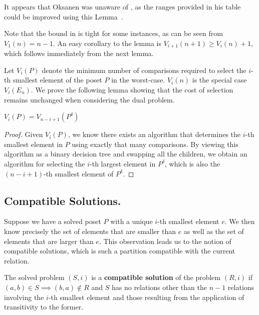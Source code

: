 \documentclass[a4paper,UKenglish,cleveref, autoref, thm-restate]{lipics-v2021}
\newcommand{\dual}[1]{{#1}^{\delta}}
\begin{document}
\begin{remark}
  It appears that Oksanen was unaware of , as the ranges provided in his table could be improved using this Lemma~\cite{Oksanen}.
\end{remark}

Note that the bound in  is tight for some instances, as can be seen from $V_1(n) = n - 1$.
An easy corollary to the lemma is $V_{i + 1}(n + 1) \geq V_i(n) + 1$, which follows immediately from the next lemma.

Let $V_i(P)$ denote the minimum number of comparisons required to select the $i$-th smallest element of the poset $P$ in the worst-case.
$V_i(n)$ is the special case $V_i(E_n)$.
We prove the following lemma showing that the cost of selection remains unchanged when considering the dual problem.

\begin{lemma} \label{lemma:dual_poset_allowed}
  $V_i(P) = V_{n - i + 1}(\dual{P})$
\end{lemma}

\begin{proof}
  Given $V_i(P)$, we know there exists an algorithm that determines the $i$-th smallest element in $P$ using exactly that many comparisons.
  By viewing this algorithm as a binary decision tree and swapping all the children, we obtain an algorithm for selecting the $i$-th largest element in $\dual{P}$, which is also the $(n - i + 1)$-th smallest element of $\dual{P}$.
\end{proof}

\subsection{Compatible Solutions.}
Suppose we have a solved poset $P$ with a unique $i$-th smallest element $e$.
We then know precisely the set of elements that are smaller than $e$ as well as the set of elements that are larger than $e$.
This observation leads us to the notion of compatible solutions, which is such a partition compatible with the current relation.

\begin{definition}
  The solved problem $(S, i)$ is a \textbf{compatible solution} of the problem $(R, i)$ if $(a, b) \in S \implies (b, a) \notin R$ and $S$ has no relations other than the $n - 1$ relations involving the $i$-th smallest element and those resulting from the application of transitivity to the former.
\end{definition}
\end{document}
